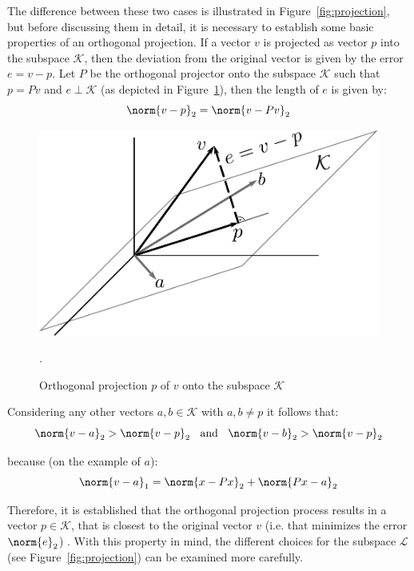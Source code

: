 \noindent The difference between these two cases is illustrated in Figure~\hyperref[fig:projection]{\ref{fig:projection}}, but before discussing them in detail, it is necessary to establish some basic properties of an orthogonal projection. If a vector $v$ is projected as vector $p$ into the subspace $\mathcal{K}$, then the deviation from the original vector is given by the error $e = v-p$. Let $P$ be the orthogonal projector onto the subspace $\mathcal{K}$ such that $p=Pv$ and $e\perp \mathcal{K}$ (as depicted in Figure~\hyperref[fig:subspace2]{\ref{fig:subspace2}}), then the length of $e$ is given by:
\begin{equation}
    \norm{v-p}_2 = \norm{v-Pv}_2
\end{equation}

\begin{figure}[h]
    \centering
    \includegraphics[width=0.7\linewidth]{chapters/2_solvers/2_3_iterative_solvers/figures/subspace2.pdf}
    \caption{Orthogonal projection $p$ of $v$ onto the subspace $\mathcal{K}$}.
    \label{fig:subspace2}
\end{figure}

\noindent Considering any other vectors $a,b \in \mathcal{K}$ with $a,b \neq p$ it follows that:
\begin{equation}
    \norm{v-a}_2>\norm{v-p}_2 \;\; \text{ and }\;\; \norm{v-b}_2>\norm{v-p}_2
\end{equation}

\noindent because (on the example of $a$):
\begin{equation}
    \norm{v-a}_1=\norm{x-Px}_2+\norm{Px-a}_2
\end{equation}

\noindent Therefore, it is established that the orthogonal projection process results in a vector $p \in \mathcal{K}$, that is closest to the original vector $v$ (i.e. that minimizes the error $\norm{e}_2$) \cite{strang_introduction_2009}. With this property in mind, the different choices for the subspace $\mathcal{L}$ (see Figure~\hyperref[fig:projection]{\ref{fig:projection}}) can be examined more carefully.

